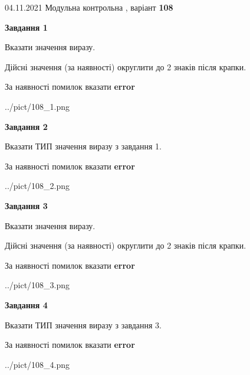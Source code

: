 \documentclass[11pt, ukrainian]{article}
\begin{document}
{04.11.2021 Модульна контрольна , варіант  \No \textbf { 108 }\par}
{
\begin {large}
{\begin {center}\textbf{Завдання 1}\end {center}}\par
Вказати значення виразу. \par
Дійсні значення (за наявності) округлити до 2 знаків після крапки. \par
За наявності помилок вказати \textbf{error}

\begin{center}
	{../pict/108_1.png}
\end{center}
\newpage

{\begin {center}\textbf{Завдання 2}\end {center}}\par
Вказати ТИП значення виразу з завдання 1. \par
За наявності помилок вказати \textbf{error}

\begin{center}
	{../pict/108_2.png}
\end{center}
\newpage

{\begin {center}\textbf{Завдання 3}\end {center}}\par
Вказати значення виразу. \par
Дійсні значення (за наявності) округлити до 2 знаків після крапки. \par
За наявності помилок вказати \textbf{error}

\begin{center}
	{../pict/108_3.png}
\end{center}
\newpage

{\begin {center}\textbf{Завдання 4}\end {center}}\par
Вказати ТИП значення виразу з завдання 3. \par
За наявності помилок вказати \textbf{error}

\begin{center}
	{../pict/108_4.png}
\end{center}
\newpage


\end{large}}
\end{document}
